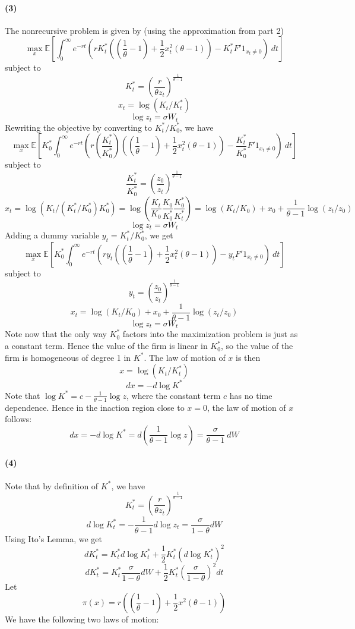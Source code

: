 \documentclass[10pt,letter]{article}
\newcommand{\problempart}[1]{\paragraph{#1}}
\begin{document}
\problempart{(3)}
The nonrecursive problem is given by (using the approximation from part 2)
\[ \max_x \mathbb{E} \left[ \int_0^\infty e^{-rt}\left(r K^*_t \left(\left(\frac{1}{\theta} -1 \right) + \frac{1}{2}x_t^2\left( \theta -  1\right)\right) - K^*_tF'1_{x_t \neq 0}\right)\ dt \right]  \]
subject to
\[ K^*_t = \left(\frac{r}{\theta z_t}\right)^{\frac{1}{\theta - 1}} \]
\[ x_t = \log(K_t/K^*_t) \]
\[ \log z_t = \sigma W_t \]
Rewriting the objective by converting to $K^*_t/K^*_0$, we have
\[ \max_x \mathbb{E} \left[ K^*_0 \int_0^\infty e^{-rt}\left(r \left(\frac{ K^*_t}{K^*_0} \right) \left(\left(\frac{1}{\theta} -1 \right) + \frac{1}{2}x_t^2\left( \theta -  1\right)\right) - \frac{ K^*_t}{K^*_0} F'1_{x_t \neq 0}\right)\ dt \right]  \]
subject to
\[ \frac{ K^*_t}{K^*_0}  = \left(\frac{z_0}{ z_t}\right)^{\frac{1}{\theta - 1}} \]
\[ x_t = \log(K_t/(K^*_t/K^*_0)K^*_0) = \log\left(\frac{K_t}{K_0} \frac{K_0}{K^*_0} \frac{K^*_0}{K^*_t} \right) = \log(K_t/K_0) + x_0 + \frac{1}{\theta - 1} \log(z_t/z_0) \]
\[ \log z_t = \sigma W_t \]
Adding a dummy variable $y_t = K^*_t/K^*_0$, we get
\[ \max_x \mathbb{E} \left[ K^*_0 \int_0^\infty e^{-rt}\left(r y_t \left(\left(\frac{1}{\theta} -1 \right) + \frac{1}{2}x_t^2\left( \theta -  1\right)\right) - y_t F'1_{x_t \neq 0}\right)\ dt \right]  \]
subject to
\[ y_t  = \left(\frac{z_0}{ z_t}\right)^{\frac{1}{\theta - 1}} \]
\[ x_t = \log(K_t/K_0) + x_0 + \frac{1}{\theta - 1} \log(z_t/z_0) \]
\[ \log z_t = \sigma W_t \]
Note now that the only way $K^*_0$ factors into the maximization problem is just as a constant term. Hence the value of the firm is linear in $K^*_0$, so the value of the firm is homogeneous of degree 1 in $K^*$. The law of motion of $x$ is then
\[ x = \log(K_t/K_t^*) \]
\[ dx = - d \log K^* \]
Note that $\log K^* = c - \frac{1}{\theta - 1} \log z$, where the constant term $c$ has no time dependence.
Hence in the inaction region close to $x=0$, the law of motion of $x$ follows:
\[ dx = - d \log K^* =  d\left( \frac{1}{\theta - 1} \log z \right) =  \frac{\sigma }{\theta - 1} \ dW  \]
\problempart{(4)}
Note that by definition of $K^*$, we have
\[ K^*_t = \left(\frac{r}{\theta z_t}\right)^{\frac{1}{\theta - 1}} \]
\[ d \log K^*_t = - \frac{1}{\theta - 1} d \log z_t = \frac{\sigma }{1 - \theta} dW \]
Using Ito's Lemma, we get
\[ dK^*_t = K^*_t d\log K^*_t + \frac{1}{2}K^*_t(d\log K^*_t)^2 \]
\[ dK^*_t = K^*_t \frac{\sigma}{1-\theta} dW  + \frac{1}{2}K^*_t\left(\frac{\sigma }{1 - \theta}\right)^2 dt \]
Let
\[ \pi(x) = r\left(\left(\frac{1}{\theta} -1 \right) + \frac{1}{2}x^2\left( \theta -  1\right)\right) \]
We have the following two laws of motion:
\end{document}
